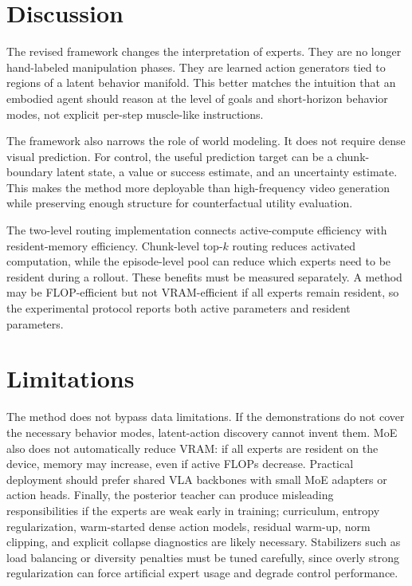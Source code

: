 \documentclass[10pt]{article}
\begin{document}
\section{Discussion}

The revised framework changes the interpretation of experts. They are no longer hand-labeled manipulation phases. They are learned action generators tied to regions of a latent behavior manifold. This better matches the intuition that an embodied agent should reason at the level of goals and short-horizon behavior modes, not explicit per-step muscle-like instructions.

The framework also narrows the role of world modeling. It does not require dense visual prediction. For control, the useful prediction target can be a chunk-boundary latent state, a value or success estimate, and an uncertainty estimate. This makes the method more deployable than high-frequency video generation while preserving enough structure for counterfactual utility evaluation.

The two-level routing implementation connects active-compute efficiency with resident-memory efficiency. Chunk-level top-$k$ routing reduces activated computation, while the episode-level pool can reduce which experts need to be resident during a rollout. These benefits must be measured separately. A method may be FLOP-efficient but not VRAM-efficient if all experts remain resident, so the experimental protocol reports both active parameters and resident parameters.

\section{Limitations}

The method does not bypass data limitations. If the demonstrations do not cover the necessary behavior modes, latent-action discovery cannot invent them. MoE also does not automatically reduce VRAM: if all experts are resident on the device, memory may increase, even if active FLOPs decrease. Practical deployment should prefer shared VLA backbones with small MoE adapters or action heads. Finally, the posterior teacher can produce misleading responsibilities if the experts are weak early in training; curriculum, entropy regularization, warm-started dense action models, residual warm-up, norm clipping, and explicit collapse diagnostics are likely necessary. Stabilizers such as load balancing or diversity penalties must be tuned carefully, since overly strong regularization can force artificial expert usage and degrade control performance.
\end{document}
